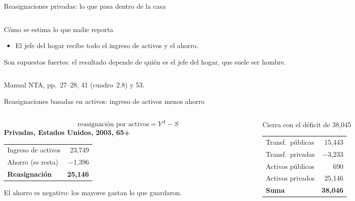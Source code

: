 \documentclass[aspectratio=169,11pt]{beamer}
\newcommand{\fuente}[1]{\par\vfill{\small\color{cGris}#1\par}}
\begin{document}
\begin{frame}{Reasignaciones privadas: lo que pasa dentro de la casa}
\begin{columns}[T]
\begin{column}{0.41\textwidth}
\begin{block}{Cómo se estima lo que nadie reporta}
\begin{itemize}
          \item El jefe del hogar recibe todo el ingreso de activos y el ahorro.
        \end{itemize}
      \end{block}
      \pause
      Son supuestos fuertes: el resultado depende de quién es el jefe del hogar, que suele ser hombre.
    \end{column}
  \end{columns}
  \fuente{Manual NTA, pp.~27--28, 41 (cuadro~2.8) y 53.}
\end{frame}

\begin{frame}{Reasignaciones basadas en activos: ingreso de activos menos ahorro}
  \begin{columns}[T]
    \begin{column}{0.52\textwidth}
      \[
        \text{reasignación por activos}=Y^A-S
      \]
      \textbf{Privadas, Estados Unidos, 2003, 65+}\par\smallskip
      \begin{tabular}{@{}lr@{}}
        \toprule
        Ingreso de activos & 23,749 \\
        Ahorro (se resta) & $-$1,396 \\
        \midrule
        \textbf{Reasignación} & \textbf{25,146} \\
        \bottomrule
      \end{tabular}
      \par\smallskip
      {\small El ahorro es negativo: los mayores gastan lo que guardaron.}
    \end{column}
    \begin{column}{0.45\textwidth}
      \pause
      \begin{block}{Cierra con el déficit de 38,045}
        \begin{tabular}{@{}lr@{}}
          Transf.\ públicas & 15,443 \\
          Transf.\ privadas & $-$3,233 \\
          Activos públicos & 690 \\
          Activos privados & 25,146 \\
          \midrule
          \textbf{Suma} & \textbf{38,046} \\
        \end{tabular}

\end{block}
\end{column}
\end{columns}
\end{frame}
\end{document}
